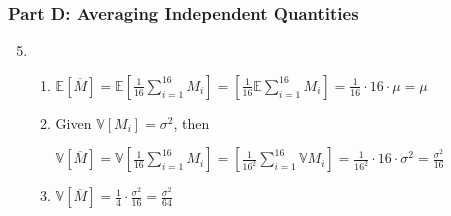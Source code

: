 \documentclass[12pt]{article}
\begin{document}
\subsubsection{Part D: Averaging Independent Quantities}
\begin{enumerate}
	\setcounter{enumi}{4}
	\item \begin{enumerate}
		\item $\mathbb{E}[\overline{M}] = \mathbb{E}[\frac{1}{16}\sum_{i=1}^{16}M_i]= [\frac{1}{16}\mathbb{E}\sum_{i=1}^{16}M_i]=\frac{1}{16} \cdot 16 \cdot \mu = \mu$
		\item Given $\mathbb{V}[M_i] = \sigma^2$, then
		
		$\mathbb{V}[\overline{M}] =\mathbb{V}[\frac{1}{16}\sum_{i=1}^{16}M_i] = [\frac{1}{16^2}\sum_{i=1}^{16}\mathbb{V}M_i] = \frac{1}{16^2} \cdot 16 \cdot \sigma^2 = \frac{\sigma^2}{16}$
		
		\item $\mathbb{V}[\overline{M}] = \frac{1}{4} \cdot \frac{\sigma^2}{16}= \frac{\sigma^2}{64}$
	\end{enumerate}
\end{enumerate}

 
\end{document}

